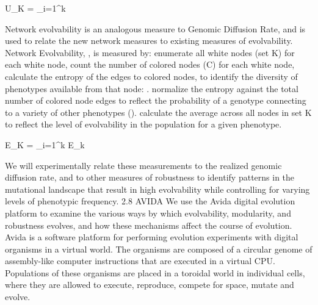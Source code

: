 U_{K} =  { \sum_{i=1}^{k}} 


Network evolvability is an analogous measure to Genomic Diffusion Rate, and is used to relate the new network measures to existing measures of evolvability.
Network Evolvability, , is measured by:
enumerate all white nodes (set K)
for each white node, count the number of colored nodes (C)
for each white node, calculate the entropy of the edges to colored nodes, to identify the diversity of phenotypes available from that node: .
normalize the entropy against the total number of colored node edges to reflect the probability of a genotype connecting to a variety of other phenotypes ().
calculate the average across all nodes in set K to reflect the level of evolvability in the population for a given phenotype.

E_{K} =  { \sum_{i=1}^{k}} E_k 


We will experimentally relate these measurements to the realized genomic diffusion rate, and to other measures of robustness to identify patterns in the mutational landscape that result in high evolvability while controlling for varying levels of phenotypic frequency.
2.8 AVIDA
We use the Avida digital evolution platform to examine the various ways by which evolvability, modularity, and robustness evolves, and how these mechanisms affect the course of evolution.
Avida is a software platform for performing evolution experiments with digital organisms in a virtual world. The organisms are composed of a circular genome of assembly-like computer instructions that are executed in a virtual CPU. Populations of these organisms are placed in a toroidal world in individual cells, where they are allowed to execute, reproduce, compete for space, mutate and evolve. 
 

